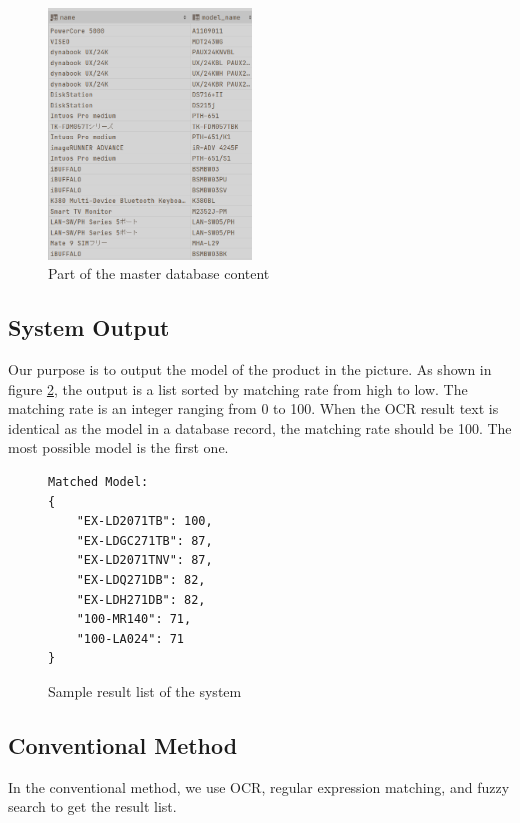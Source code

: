 \documentclass[technicalreport]{ieicej}
\begin{document}
            \begin{figure}[t] 
                \begin{center}
                \includegraphics[width=0.48\textwidth]{figure/db-sample.png}
                \end{center}
                \caption{Part of the master database content}
                \label{fig:db-sample}
            \end{figure}

    
    \subsection{System Output}
        Our purpose is to output the model of the product in the picture. As shown in figure \ref{fig:result-sample}, the output is a list sorted by matching rate from high to low. The matching rate is an integer ranging from 0 to 100. When the OCR result text is identical as the model in a database record, the matching rate should be 100. The most possible model is the first one.

        \begin{figure}[t] 
            \begin{center}
        \begin{BVerbatim}
Matched Model:
{
    "EX-LD2071TB": 100,
    "EX-LDGC271TB": 87,
    "EX-LD2071TNV": 87,
    "EX-LDQ271DB": 82,
    "EX-LDH271DB": 82,
    "100-MR140": 71,
    "100-LA024": 71
}
        \end{BVerbatim}
        \end{center}
            \caption{Sample result list of the system}
            \label{fig:result-sample}
        \end{figure}


    \subsection{Conventional Method}
        In the conventional method, we use OCR, regular expression matching, and fuzzy search to get the result list.
\end{document}
